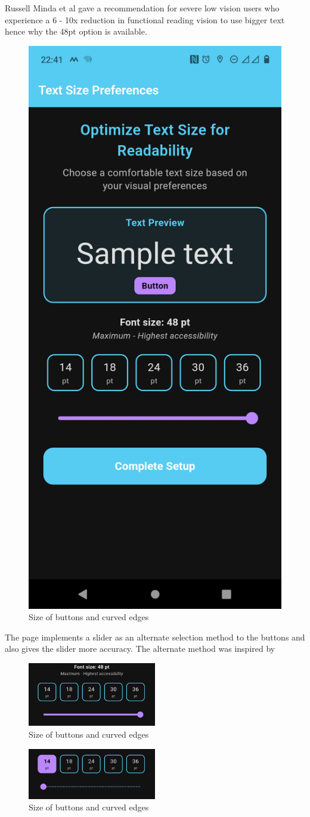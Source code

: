 \documentclass[]{project_final}
\begin{document}
\newpage
Russell Minda et al gave a recommendation for severe low vision users who experience a 6 - 10x reduction in functional reading vision to use bigger text hence why the 48pt option is available.

\begin{figure}[ht!]
    \centering
    \includegraphics[height=0.5\textwidth]{M Font Size 2.png}
    \caption{Size of buttons and curved edges}
    \label{fig:1}
\end{figure}

The page implements a slider as an alternate selection method to the buttons and also gives the slider more accuracy. The alternate method was inspired by

\begin{figure}[ht!]
    \centering
    \includegraphics[width=0.5\textwidth]{M slider zoom.png}
    \caption{Size of buttons and curved edges}
    \label{fig:1}
\end{figure}

\begin{figure}[ht!]
    \centering
    \includegraphics[width=0.5\textwidth]{M slide zoom 2.png}
    \caption{Size of buttons and curved edges}
    \label{fig:1}
\end{figure}
\end{document}
